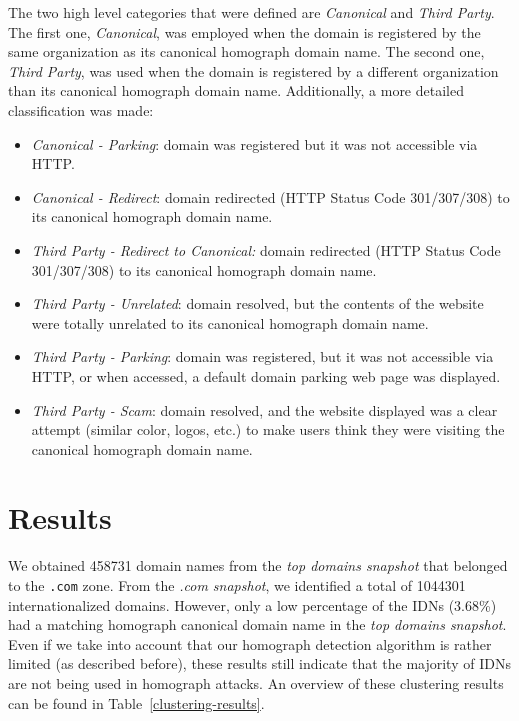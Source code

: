 \documentclass[letterpaper,twocolumn,10pt]{article}
\begin{document}
The two high level categories that were defined are \textit{Canonical} and \textit{Third Party}.
The first one, \textit{Canonical}, was employed when the domain is registered by the same organization as its canonical homograph domain name.
The second one, \textit{Third Party}, was used when the domain is registered by a different organization than its canonical homograph domain name.
Additionally, a more detailed classification was made:
\begin{itemize}
\setlength{\itemsep}{0pt}
\setlength{\parskip}{0pt}
\setlength{\parsep}{0pt}
\item \textit{Canonical - Parking}: domain was registered but it was not accessible via HTTP.
\item \textit{Canonical - Redirect}: domain redirected (HTTP Status Code 301/307/308) to its canonical homograph domain name.
\item \textit{Third Party - Redirect to Canonical:} domain redirected (HTTP Status Code 301/307/308) to its canonical homograph domain name.
\item \textit{Third Party - Unrelated}: domain resolved, but the contents of the website were totally unrelated to its canonical homograph domain name.
\item \textit{Third Party - Parking}: domain was registered, but it was not accessible via HTTP, or when accessed, a default domain parking web page was displayed.
\item \textit{Third Party - Scam}: domain resolved, and the website displayed was a clear attempt (similar color, logos, etc.) to make users think they were visiting the canonical homograph domain name.
\end{itemize}

\section{Results}
We obtained 458731 domain names from the \textit{top domains snapshot} that belonged to the \texttt{.com} zone.
From the \textit{.com snapshot}, we identified a total of 1044301 internationalized domains.
However, only a low percentage of the IDNs (3.68\%) had a matching homograph canonical domain name in the \textit{top domains snapshot}.
Even if we take into account that our homograph detection algorithm is rather limited (as described before), these results still indicate that the majority of IDNs are not being used in homograph attacks.
An overview of these clustering results can be found in Table~\ref{clustering-results}.
\end{document}
